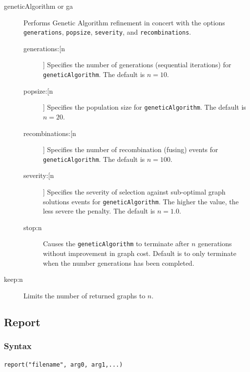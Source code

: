 \begin{description}
					
		\item[geneticAlgorithm or ga] Performs Genetic Algorithm \citep{Holland1975} refinement in 
		concert with the options \texttt{generations}, \texttt{popsize}, \texttt{severity}, and 
		\texttt{recombinations}. 
			
			\begin{description}
		
			\item[generations:[n]] Specifies the number of generations (sequential iterations) for 
			\texttt{geneticAlgorithm}. The default is $n=10$.

			\item[popsize:[n]] Specifies the population size for \texttt{geneticAlgorithm}. The default is 
			$n=20$.
			
			\item[recombinations:[n]] Specifies the number of recombination (fusing) events for 
			\texttt{geneticAlgorithm}. The default is $n=100$.
			
			\item[severity:[n]] Specifies the severity of selection against sub-optimal graph solutions 
			events for \texttt{geneticAlgorithm}. The higher the value, the less severe the penalty. The 
			default is $n=1.0$.
			
			\item[stop:n] Causes the \texttt{geneticAlgorithm} to terminate after $n$ generations without improvement 
			in graph cost.  Default is to only terminate when the number generations has been completed.

			\end{description}
		
		\item[keep:n] Limits the number of returned graphs to $n$. 
		
		\end{description}
	
\subsection{Report}
	\subsubsection{Syntax}
		\texttt{report("filename", arg0, arg1,...)}
	
